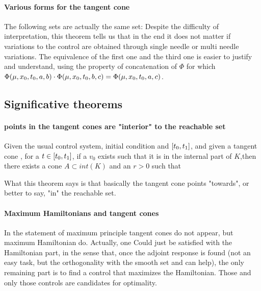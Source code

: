 \paragraph[lemma 5.5]{Various forms for the tangent cone}
 The following sets are actually the same set: 
Despite the difficulty of interpretation, this theorem tells us that in the end it does not matter if variations to the control are obtained through single needle or multi needle variations. The equivalence of the first one and the third one is easier to justify and understand, using the property of concatenation of $\Phi$ for which $\Phi(\mu,x_0,t_0,a,b)\cdot\Phi(\mu,x_0,t_0,b,c)=\Phi(\mu,x_0,t_0,a,c)$.


\subsection{Significative theorems}
\paragraph[5.10]{points in the tangent cones are "interior" to the reachable set}
 Given the usual control system, initial condition and $[t_0,t_1]$, and given a tangent cone , for a $t\in[t_0,t_1]$, if a $v_0$ exists such that it is in the internal part of $K$,then there exists a cone $A\subset int(K)$ and an $r>0$ such that 

What this theorem says is that basically the tangent cone points "towards", or better to say, "in" the reachable set. 

\paragraph[5.12-5.14]{Maximum Hamiltonians and tangent cones}
In the statement of maximum principle tangent cones do not appear, but maximum Hamiltonian do. Actually, one Could just be satisfied with the Hamiltonian part, in the sense that, once the adjoint response is found (not an easy task, but the orthogonality with the smooth set \so\space and \sz\space can help), the only remaining part is to find a control that maximizes the Hamiltonian. Those and only those controls are candidates for optimality. 

